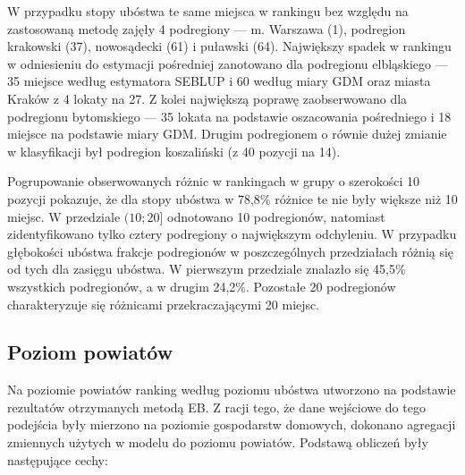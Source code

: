 W przypadku stopy ubóstwa te same miejsca w rankingu bez względu na zastosowaną metodę zajęły 4 podregiony --- m. Warszawa (1), podregion krakowski (37), nowosądecki (61) i puławski (64). Największy spadek w rankingu w odniesieniu do estymacji pośredniej zanotowano dla podregionu elbląskiego --- 35 miejsce według estymatora SEBLUP i 60 według miary GDM oraz miasta Kraków z 4 lokaty na 27. Z kolei największą poprawę zaobserwowano dla podregionu bytomskiego --- 35 lokata na podstawie oszacowania pośredniego i 18 miejsce na podstawie miary GDM. Drugim podregionem o równie dużej zmianie w klasyfikacji był podregion koszaliński (z 40 pozycji na 14).

Pogrupowanie obserwowanych różnic w rankingach w grupy o szerokości 10 pozycji pokazuje, że dla stopy ubóstwa w 78,8\% różnice te nie były większe niż 10 miejsc. W przedziale $(10;20]$ odnotowano 10 podregionów, natomiast zidentyfikowano tylko cztery podregiony o największym odchyleniu. W przypadku głębokości ubóstwa frakcje podregionów w poszczególnych przedziałach różnią się od tych dla zasięgu ubóstwa. W pierwszym przedziale znalazło się 45,5\% wszystkich podregionów, a w drugim 24,2\%. Pozostałe 20 podregionów charakteryzuje się różnicami przekraczającymi 20 miejsc.


\subsection{Poziom powiatów}

Na poziomie powiatów ranking według poziomu ubóstwa utworzono na podstawie rezultatów otrzymanych metodą EB. Z racji tego, że dane wejściowe do tego podejścia były mierzono na poziomie gospodarstw domowych, dokonano agregacji zmiennych użytych w modelu do poziomu powiatów. Podstawą obliczeń były następujące cechy:

